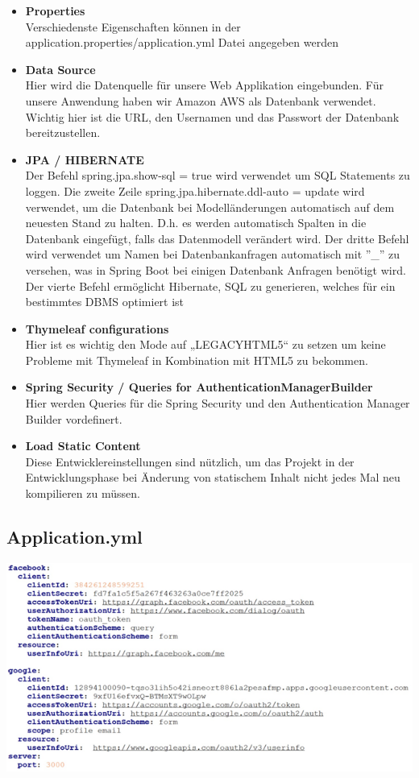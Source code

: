 \documentclass[12pt,a4paper]{article}
\begin{document}
\begin{itemize}
	\item \textbf{Properties}\\
	Verschiedenste Eigenschaften können in der application.properties/application.yml Datei angegeben werden
	\item \textbf{Data Source}\\
	Hier wird die Datenquelle für unsere Web Applikation eingebunden. Für unsere Anwendung haben wir Amazon AWS als Datenbank verwendet. Wichtig hier ist die URL, den Usernamen und das Passwort der Datenbank bereitzustellen.
	\item \textbf{JPA / HIBERNATE}\\
	Der Befehl spring.jpa.show-sql = true wird verwendet um SQL Statements zu loggen. Die zweite Zeile spring.jpa.hibernate.ddl-auto = update wird verwendet, um die Datenbank bei Modelländerungen automatisch auf dem neuesten Stand zu halten. D.h. es werden automatisch Spalten in die Datenbank eingefügt, falls das Datenmodell verändert wird. Der dritte Befehl wird verwendet um Namen bei Datenbankanfragen automatisch mit ''\_'' zu versehen, was in Spring Boot bei einigen Datenbank Anfragen benötigt wird. Der vierte Befehl ermöglicht Hibernate, SQL zu generieren, welches für ein bestimmtes DBMS optimiert ist
	\item \textbf{Thymeleaf configurations}\\
	Hier ist es wichtig den Mode auf „LEGACYHTML5“ zu setzen um keine Probleme mit Thymeleaf in Kombination mit HTML5 zu bekommen.
	\item \textbf{Spring Security / Queries for AuthenticationManagerBuilder}\\
	Hier werden Queries für die Spring Security und den Authentication Manager Builder vordefinert.
	\item \textbf{Load Static Content}\\
	Diese Entwicklereinstellungen sind nützlich, um das Projekt in der Entwicklungsphase bei Änderung von statischem Inhalt nicht jedes Mal neu kompilieren zu müssen.
\end{itemize}


\subsection{Application.yml}

\hspace{-5em} \includegraphics[width=1.2\textwidth]{./Graphics/bild2}
\end{document}
